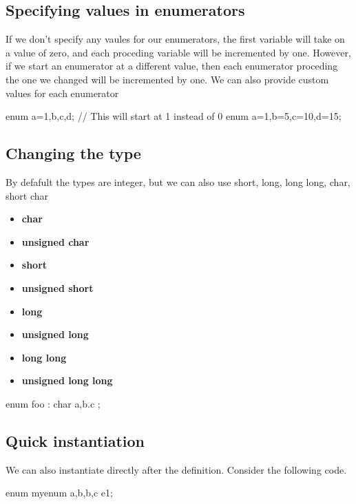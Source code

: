 \documentclass{report}
\begin{document}
    \bigbreak \noindent 
    \subsection{Specifying values in enumerators}
    \bigbreak \noindent 
    If we don't specify any vaules for our enumerators, the first variable will take on a value of zero, and each proceding variable will be incremented by one. However, if we start an enumerator at a different value, then each enumerator proceding the one we changed will be incremented by one.
    \bigbreak \noindent 
    We can also provide custom values for each enumerator
    \bigbreak \noindent 
    \begin{cppcode}
enum {a=1,b,c,d}; // This will start at 1 instead of 0
enum {a=1,b=5,c=10,d=15}; 
    \end{cppcode}
    
    \bigbreak \noindent 
    \subsection{Changing the type}
    \bigbreak \noindent 
    By defafult the types are integer, but we can also use short, long, long long, char, short char
    \begin{itemize}
        \item \textbf{char}
        \item \textbf{unsigned char}
        \item \textbf{short }
        \item \textbf{unsigned short}
        \item \textbf{long }
        \item \textbf{unsigned long}
        \item \textbf{long long}
        \item \textbf{unsigned long long}
    \end{itemize}
    \bigbreak \noindent 
    \begin{cppcode}
        enum foo : char {
            a,b.c
        };
    \end{cppcode}
    \bigbreak \noindent 
    \subsection{Quick instantiation}
    \bigbreak \noindent 
    We can also instantiate directly after the definition. Consider the following code.
    \begin{cppcode}
enum myenum {a,b,b,c} e1;
    \end{cppcode}
    
\end{document}
